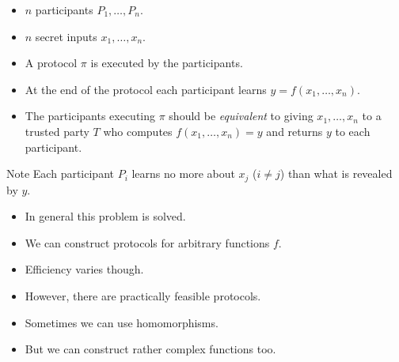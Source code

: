 \begin{frame}
  \begin{definition}
    \begin{itemize}
      \item \(n\) participants \(P_1, \ldots, P_n\).
      \item \(n\) secret inputs \(x_1, \ldots, x_n\).

        \pause{}

      \item A protocol \(\pi\) is executed by the participants.
      \item At the end of the protocol each participant learns \(y = f(x_1, 
          \ldots, x_n)\).

        \pause{}

      \item The participants executing \(\pi\) should be \emph{equivalent} to 
        giving \(x_1, \ldots, x_n\) to a trusted party \(T\) who computes 
        \(f(x_1, \ldots, x_n) = y\) and returns \(y\) to each participant.
    \end{itemize}
  \end{definition}

  \pause{}

  \begin{block}{Note}
    Each participant \(P_i\) learns no more about \(x_j\) (\(i\neq j\))
    than what is revealed by \(y\).
  \end{block}
\end{frame}

\begin{frame}
  \begin{itemize}
    \item In general this problem is solved.
    \item We can construct protocols for arbitrary functions \(f\).

      \pause{}

    \item Efficiency varies though.
    \item However, there are practically feasible protocols.

      \pause{}

    \item Sometimes we can use homomorphisms.
    \item But we can construct rather complex functions too.
  \end{itemize}
\end{frame}

